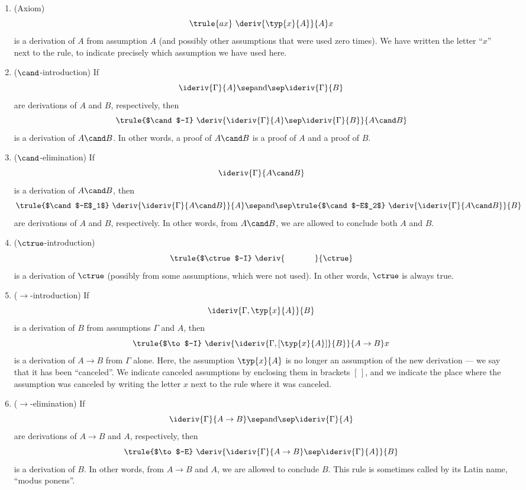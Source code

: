 \documentclass[12pt]{article}
\begin{document}
\begin{enumerate}
\item (Axiom) 
\[ \trule{ax}\ \deriv{\typ{x}{A}}{A} x
\]
is a derivation of $A$ from assumption $A$ (and possibly other
assumptions that were used zero times). We have written the letter
``$x$'' next to the rule, to indicate precisely which assumption we
have used here.
\item ($\cand$-introduction)
If 
\[ \ideriv{\Gamma}{A} \sep\mbox{and}\sep
   \ideriv{\Gamma}{B}
\]
are derivations of $A$ and $B$, respectively, then
\[
\trule{$\cand$-I}\ \deriv{\ideriv{\Gamma}{A}\sep\ideriv{\Gamma}{B}}{A\cand
  B}
\]
is a derivation of $A\cand B$. In other words, a proof of $A\cand B$
is a proof of $A$ and a proof of $B$.
\item ($\cand$-elimination)
If 
\[ \ideriv{\Gamma}{A\cand B}
\]
is a derivation of $A\cand B$, then
\[
\trule{$\cand$-E$_1$}\ \deriv{\ideriv{\Gamma}{A\cand
    B}}{A} 
\sep\mbox{and}\sep
\trule{$\cand$-E$_2$}\ \deriv{\ideriv{\Gamma}{A\cand
    B}}{B} 
\]
are derivations of $A$ and $B$, respectively. In other words, from
$A\cand B$, we are allowed to conclude both $A$ and $B$. 
\item ($\ctrue$-introduction)
\[ \trule{$\ctrue$-I}\ \deriv{\hspace{.5in}}{\ctrue}
\]
is a derivation of $\ctrue$ (possibly from some assumptions, which
were not used). In other words, $\ctrue$ is always true.
\item ($\to$-introduction)
If
\[ \ideriv{\Gamma,\typ{x}{A}}{B}
\]
is a derivation of $B$ from assumptions $\Gamma$ and $A$, then 
\[ \trule{$\to$-I}\ \deriv{\ideriv{\Gamma,[\typ{x}{A}]}{B}}{A\to B} x
\]
is a derivation of $A\to B$ from $\Gamma$ alone. Here, the assumption
$\typ{x}{A}$ is no longer an assumption of the new derivation --- we
say that it has been ``canceled''. We indicate canceled assumptions
by enclosing them in brackets $[\,]$, and we indicate the place where
the assumption was canceled by writing the letter $x$ next to the rule
where it was canceled.
\item ($\to$-elimination)
If 
\[  \ideriv{\Gamma}{A\to B} \sep\mbox{and}\sep
   \ideriv{\Gamma}{A}
\]
are derivations of $A\to B$ and $A$, respectively, then
\[ \trule{$\to$-E}\ \deriv{\ideriv{\Gamma}{A\to B} \sep
  \ideriv{\Gamma}{A}}{B}
\]
is a derivation of $B$. In other words, from $A\to B$ and $A$, we are
allowed to conclude $B$. This rule is sometimes called by its Latin
name, ``modus ponens''.
\suspendenumerate
\end{enumerate}
\end{document}

